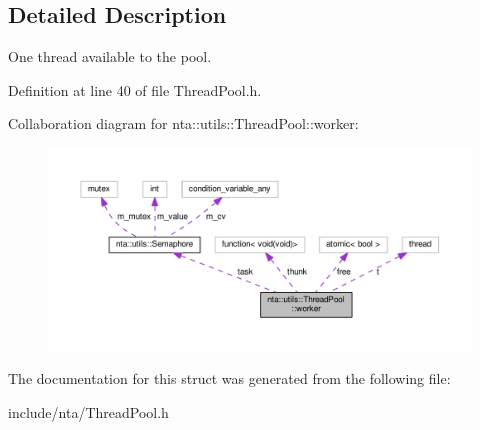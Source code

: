 \subsection{Detailed Description}
One thread available to the pool. 

Definition at line 40 of file Thread\+Pool.\+h.



Collaboration diagram for nta\+:\+:utils\+:\+:Thread\+Pool\+:\+:worker\+:\nopagebreak
\begin{figure}[H]
\begin{center}
\leavevmode
\includegraphics[width=350pt]{da/d21/structnta_1_1utils_1_1ThreadPool_1_1worker__coll__graph}
\end{center}
\end{figure}


The documentation for this struct was generated from the following file\+:\begin{DoxyCompactItemize}
\item 
include/nta/Thread\+Pool.\+h\end{DoxyCompactItemize}
